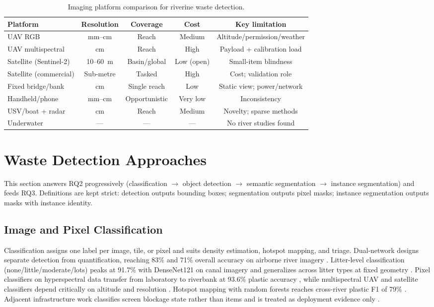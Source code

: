 \documentclass[12pt]{article}
\begin{document}
\begin{table}[!t]
\centering
\caption{Imaging platform comparison for riverine waste detection.}
\label{tab:platforms}
\begin{tabular}{lcccc}
\hline
\textbf{Platform} & \textbf{Resolution} & \textbf{Coverage} & \textbf{Cost} & \textbf{Key limitation} \\
\hline
UAV RGB & mm--cm & Reach & Medium & Altitude/permission/weather \\
UAV multispectral & cm & Reach & High & Payload + calibration load \\
Satellite (Sentinel-2) & 10--60~m & Basin/global & Low (open) & Small-item blindness \\
Satellite (commercial) & Sub-metre & Tasked & High & Cost; validation role \\
Fixed bridge/bank & cm & Single reach & Low & Static view; power/network \\
Handheld/phone & mm--cm & Opportunistic & Very low & Inconsistency \\
USV/boat + radar & cm & Reach & Medium & Novelty; sparse methods \\
Underwater & --- & --- & --- & No river studies found \\
\hline
\end{tabular}
\end{table}

\section{Waste Detection Approaches}
\label{sec:approaches}

This section answers RQ2 progressively (classification $\rightarrow$ object detection $\rightarrow$ semantic segmentation $\rightarrow$ instance segmentation) and feeds RQ3. Definitions are kept strict: detection outputs bounding boxes; segmentation outputs pixel masks; instance segmentation outputs masks with instance identity.

\subsection{Image and Pixel Classification}
Classification assigns one label per image, tile, or pixel and suits density estimation, hotspot mapping, and triage. Dual-network designs separate detection from quantification, reaching 83\% and 71\% overall accuracy on airborne river imagery \cite{Wolf2020}. Litter-level classification (none/little/moderate/lots) peaks at 91.7\% with DenseNet121 on canal imagery and generalizes across litter types at fixed geometry \cite{JiaFrontiers2023}. Pixel classifiers on hyperspectral data transfer from laboratory to riverbank at 93.6\% plastic accuracy \cite{Tasseron2022}, while multispectral UAV and satellite classifiers depend critically on altitude and resolution \cite{Cortesi2022,Mohsen2023}. Hotspot mapping with random forests reaches cross-river plastic F1 of 79\% \cite{PerezGarcia2025}. Adjacent infrastructure work classifies screen blockage state rather than items and is treated as deployment evidence only \cite{Vandaele2024}.
\end{document}
